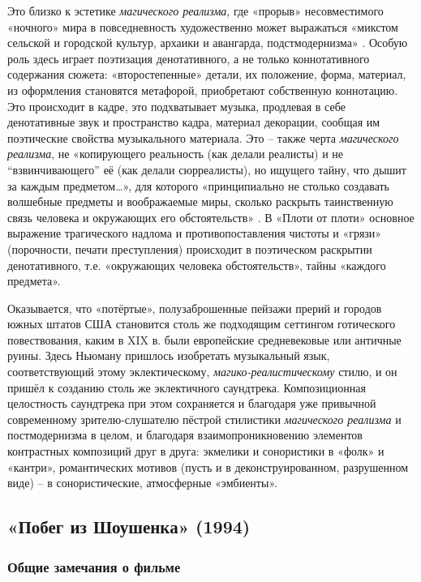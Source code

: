 Это близко к эстетике \emph{магического реализма}, где «прорыв» несовместимого «ночного» мира в повседневность художественно может выражаться «микстом сельской и городской культур, архаики и авангарда, подстмодернизма» \autocite[ см. \emph{Магический реализм}]{bychkov.lexikon.2003}.
Особую роль здесь играет поэтизация денотативного, а не только коннотативного содержания сюжета: «второстепенные» детали, их положение, форма, материал, из оформления становятся метафорой, приобретают собственную коннотацию.
Это происходит в кадре, это подхватывает музыка, продлевая в себе денотативные звук и пространство кадра, материал декорации, сообщая им поэтические свойства музыкального материала.
Это -- также черта \emph{магического реализма}, не «копирующего реальность (как делали реалисты) и не ``взвинчивающего'' её (как делали сюрреалисты), но ищущего тайну, что дышит за каждым предметом\ldots{}», для которого «принципиально не столько создавать волшебные предметы и воображаемые миры, сколько раскрыть таинственную связь человека и окружающих его обстоятельств» \autocite[ пер. -- мой]{carpentier.magicalrealism.1995}.
В «Плоти от плоти» основное выражение трагического надлома и противопоставления чистоты и «грязи» (порочности, печати преступления) происходит в поэтическом раскрытии денотативного, т.е. «окружающих человека обстоятельств», тайны «каждого предмета».

Оказывается, что «потёртые», полузаброшенные пейзажи прерий и городов южных штатов США становится столь же подходящим сеттингом готического повествования, каким в XIX в. были европейские средневековые или античные руины.
Здесь Ньюману пришлось изобретать музыкальный язык, соответствующий этому эклектическому, \emph{магико-реалистическому} стилю, и он пришёл к созданию столь же эклектичного саундтрека.
Композиционная целостность саундтрека при этом сохраняется и благодаря уже привычной современному зрителю-слушателю пёстрой стилистики \emph{магического реализма} и постмодернизма в целом, и благодаря взаимопроникновению элементов контрастных композиций друг в друга: экмелики и сонористики в «фолк» и «кантри», романтических мотивов (пусть и в деконструированном, разрушенном виде) -- в сонористические, атмосферные «эмбиенты».

\subsection{«Побег из Шоушенка» (1994)}\label{sec.SmEt.Sh}

\subsubsection{Общие замечания о фильме}\label{ux43eux431ux449ux438ux435-ux437ux430ux43cux435ux447ux430ux43dux438ux44f-ux43e-ux444ux438ux43bux44cux43cux435-2}

